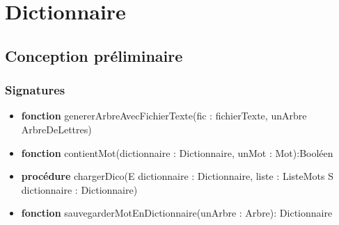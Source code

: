 \documentclass{article}
\begin{document}
    \pagestyle{empty}
    \noindent

    \section*{Dictionnaire}
    \subsection*{Conception préliminaire}
    \subsubsection*{Signatures}

	\begin{itemize}[label=$\ $, leftmargin=1cm]
		 \item \textbf{fonction} genererArbreAvecFichierTexte(fic : fichierTexte, unArbre ArbreDeLettres)
		 \item \textbf{fonction} contientMot(dictionnaire : Dictionnaire, unMot : Mot):Booléen
         \item \textbf{procédure} chargerDico(E dictionnaire : Dictionnaire, liste : ListeMots S dictionnaire : Dictionnaire) 
         \item \textbf{fonction} sauvegarderMotEnDictionnaire(unArbre : Arbre): Dictionnaire
	\end{itemize}
	
 
\end{document}
